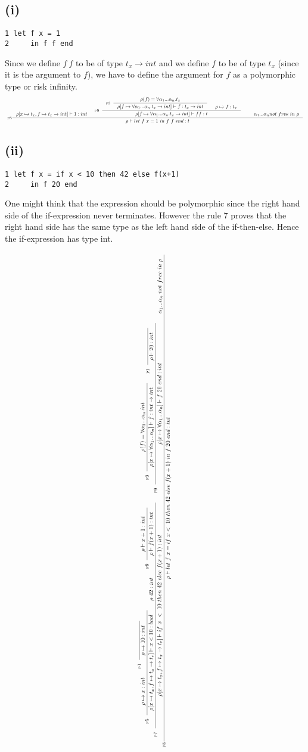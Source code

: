 \documentclass[a4paper]{article}
\newcommand{\RULE}[1]{\textsc{#1}}
\begin{document}
\subsection*{(i)}
\begin{verbatim}
1 let f x = 1
2     in f f end
\end{verbatim}
Since we define $f\ f$ to be of type $t_x \to int$ and we define $f$ to be of type $t_x$ (since it is the argument to $f$), we have to define the argument for $f$ as a polymorphic type or risk infinity.
\\

$$
  \scalebox{0.6}{
    \inference[\RULE{p8}]{
      \rho[x \mapsto t_x, f \mapsto t_x \to int] \vdash 1 : int &
      \inference[\RULE{p9}]{
        \inference[\RULE{p3}]{
          \rho (f) = \forall \alpha_1 ... \alpha_n.t_x
        }{
          \rho [f \mapsto \forall \alpha_1 ... \alpha_n.t_x \to int] \vdash f : t_x \to int
        } &
        \rho \mapsto f : t_x
      }{
        \rho[f \mapsto \forall \alpha_1 ... \alpha_n.t_x \to int] \vdash ff : t 
      } &
      \quad \alpha_1 ... \alpha_n not\ free\ in\ \rho
    }{
      \rho \vdash let\ f\ x = 1\ in\ f\ f\ end : t
    }
  }
$$

\subsection*{(ii)}
\begin{verbatim}
1 let f x = if x < 10 then 42 else f(x+1)
2     in f 20 end
\end{verbatim}

One might think that the expression should be polymorphic since the right hand side of the if-expression never terminates. However the rule 7 proves that the right hand side has the same type as the left hand side of the if-then-else. Hence the if-expression has type int. 

$$
\scalebox{0.7}{
  \rotatebox{90}{
  \inference[\RULE{p8}]{
    \inference[\RULE{p7}]{
      \inference[\RULE{p5}]{
        \rho \mapsto x : int &
        \inference[\RULE{p1}]{}{\rho \mapsto 10 : int}
      }{
        \rho [x \mapsto t_x, f \mapsto t_x \to t_r] \vdash x < 10 : bool
      } &
      \rho\ 42 : int &
      \inference[\RULE{p9}]{
        \rho \vdash x + 1 : int
      }{
        \rho \vdash f(x + 1) : int
      }
    }{
      \rho [x \mapsto t_x, f \mapsto t_x \to t_r] \vdash if\ x\ <\ 10\ then\ 42\ else\ f(x+1) : int
    } &
    \inference[\RULE{p9}]{
      \inference[\RULE{p3}]{
        \rho(f) = \forall \alpha_1 ... \alpha_n.int
      }{
        \rho [x \mapsto \forall \alpha_1 ... \alpha_n] \vdash f : int \to int
      } &
      \inference[\RULE{p1}]{}{\rho \vdash 20 : int}
    }{
      \rho [x \mapsto \forall \alpha_1 ... \alpha_n] \vdash f\ 20\ end : int
    } &
    \alpha_1 ... \alpha_n\ not\ free\ in\ \rho
  }{
    \rho \vdash let\ f\ x = if\ x <\ 10\ then\ 42\ else\ f(x+1)\ in\ f\ 20\ end : int
  }
}
}
$$
\end{document}

